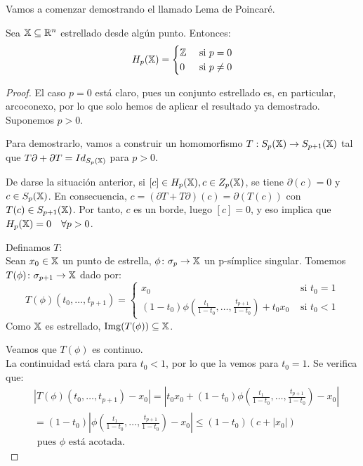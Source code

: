 Vamos a comenzar demostrando el llamado Lema de Poincaré.

\begin{lemma}
  Sea ${\mathbb X} \subseteq \mathbb{R}^n$ estrellado desde algún punto. Entonces:
  \[ H_p({\mathbb X}) = \begin{cases}  \mathbb{Z} & \text{ si } p = 0 \\
                              0  & \text{ si } p \neq 0
                            \end{cases} \]
\end{lemma}

\begin{proof}
  El caso $p = 0$ está claro, pues un conjunto estrellado es, en particular, arcoconexo, por lo que solo hemos de aplicar el resultado ya demostrado.
  Suponemos $p > 0$.

  Para demostrarlo, vamos a construir un homomorfismo $ T: S_{p}({\mathbb X}) \to S_{p+1}({\mathbb X})$ tal que $ T \partial + \partial  T = Id_{S_{p}({\mathbb X})}$ para $p > 0$.

  De darse la situación anterior, si $[c] \in H_p({\mathbb X}), c \in Z_p({\mathbb X})$, se tiene $\partial(c) = 0$ y $c \in S_p({\mathbb X})$.
  En consecuencia, $c = (\partial  T +  T \partial)(c)  = \partial( T(c))$ con $ T(c) \in S_{p+1}({\mathbb X})$.
  Por tanto, $c$ es un borde, luego $[c] = 0$, y eso implica que $H_p({\mathbb X}) = 0 \quad \forall p > 0$.

  Definamos $T$: \\
  Sean $x_0 \in {\mathbb X}$ un punto de estrella, $\phi \colon \sigma_p \to {\mathbb X}$ un p-símplice singular. Tomemos $T(\phi) \colon \sigma_{p+1} \to {\mathbb X}$ dado por:
  \[ T(\phi)(t_0,\dots,t_{p+1}) = \begin{cases} x_0 & \text{ si } t_0 = 1 \\
                                                (1-t_0)\phi(\frac{t_1}{1-t_0},\dots,\frac{t_{p+1}}{1-t_0}) + t_0 x_0 & \text{ si } t_0 < 1
                                  \end{cases} \]
  Como ${\mathbb X}$ es estrellado, $\operatorname{Img}(T(\phi)) \subseteq {\mathbb X}$.

  Veamos que $T(\phi)$ es continuo. \\
  La continuidad está clara para $t_0 < 1$, por lo que la vemos para $t_0 = 1$. Se verifica que:
  \begin{align*}
    &|T(\phi)(t_0,\dots,t_{p+1}) - x_0| = |t_0 x_0 + (1-t_0)\phi(\frac{t_1}{1-t_0},\dots,\frac{t_{p+1}}{1-t_0}) - x_0| \\
    &= (1-t_0)|\phi(\frac{t_1}{1-t_0},\dots,\frac{t_{p+1}}{1-t_0}) - x_0| \leq (1-t_0)(c + |x_0|) \\
    & \text{ pues $\phi$ está acotada.}
  \end{align*}


\end{proof}
